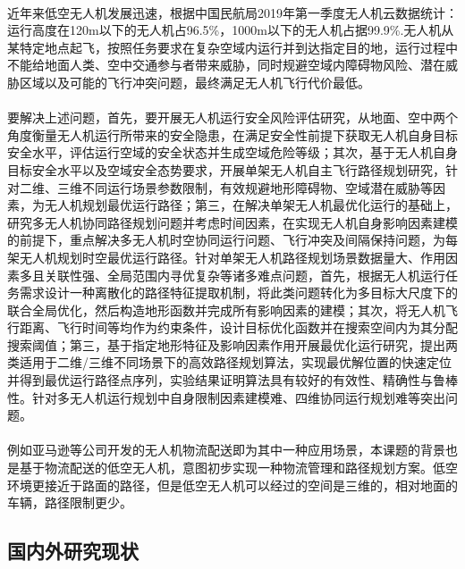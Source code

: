 \documentclass[UTF8,a4paper]{ctexart}
\begin{document}
\paragraph{}近年来低空无人机发展迅速，根据中国民航局2019年第一季度无人机云数据统计：运行高度在120m以下的无人机占96.5\%，1000m以下的无人机占据99.9\%.无人机从某特定地点起飞，按照任务要求在复杂空域内运行并到达指定目的地，运行过程中不能给地面人类、空中交通参与者带来威胁，同时规避空域内障碍物风险、潜在威胁区域以及可能的飞行冲突问题，最终满足无人机飞行代价最低。~\cite{kopardekar2016unmanned}
\paragraph{}要解决上述问题，首先，要开展无人机运行安全风险评估研究，从地面、空中两个角度衡量无人机运行所带来的安全隐患，在满足安全性前提下获取无人机自身目标安全水平，评估运行空域的安全状态并生成空域危险等级；其次，基于无人机自身目标安全水平以及空域安全态势要求，开展单架无人机自主飞行路径规划研究，针对二维、三维不同运行场景参数限制，有效规避地形障碍物、空域潜在威胁等因素，为无人机规划最优运行路径；第三，在解决单架无人机最优化运行的基础上，研究多无人机协同路径规划问题并考虑时间因素，在实现无人机自身影响因素建模的前提下，重点解决多无人机时空协同运行问题、飞行冲突及间隔保持问题，为每架无人机规划时空最优运行路径。针对单架无人机路径规划场景数据量大、作用因素多且关联性强、全局范围内寻优复杂等诸多难点问题，首先，根据无人机运行任务需求设计一种离散化的路径特征提取机制，将此类问题转化为多目标大尺度下的联合全局优化，然后构造地形函数并完成所有影响因素的建模；其次，将无人机飞行距离、飞行时间等均作为约束条件，设计目标优化函数并在搜索空间内为其分配搜索阈值；第三，基于指定地形特征及影响因素作用开展最优化运行研究，提出两类适用于二维/三维不同场景下的高效路径规划算法，实现最优解位置的快速定位并得到最优运行路径点序列，实验结果证明算法具有较好的有效性、精确性与鲁棒性。针对多无人机运行规划中自身限制因素建模难、四维协同运行规划难等突出问题。~\cite{liuyang}
\paragraph{}例如亚马逊等公司开发的无人机物流配送即为其中一种应用场景，本课题的背景也是基于物流配送的低空无人机，意图初步实现一种物流管理和路径规划方案。低空环境更接近于路面的路径，但是低空无人机可以经过的空间是三维的，相对地面的车辆，路径限制更少。
\subsection{国内外研究现状}
\end{document}
